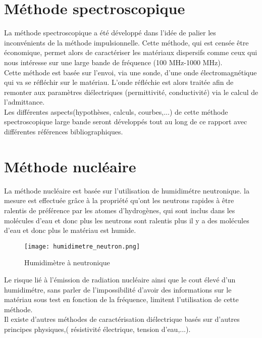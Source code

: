 \section{Méthode spectroscopique}
La méthode spectroscopique a été développé dans l'idée de palier les inconvénients de la méthode impulsionnelle. Cette méthode, qui est censée être économique, permet alors de caractériser les matériaux dispersifs comme ceux qui nous intéresse sur une large bande de fréquence (100 MHz-1000 MHz).\\
Cette méthode est basée sur l'envoi, via une sonde, d'une onde électromagnétique qui va se réfléchir sur le matériau. L'onde réfléchie est alors traitée afin de remonter aux paramètres diélectriques (permittivité, conductivité) via le calcul de l'admittance.\\
Les différentes aspects(hypothèses, calculs, courbes,...) de cette méthode spectroscopique large bande seront développés tout au long de ce rapport avec différentes références bibliographiques.
\section{Méthode nucléaire}
La méthode nucléaire est basée sur l'utilisation de humidimétre neutronique. la mesure est effectuée grâce à la propriété qu'ont les neutrons rapides à être ralentis de préférence par les atomes d'hydrogènes, qui sont inclus dans les molécules d'eau et donc plus les neutrons sont ralentis plus il y a des molécules d'eau et donc plus le matériau est humide.\\
\begin{figure}[h!]
\centering
\texttt{[image: humidimetre\_neutron.png]}
\caption{Humidimètre à neutronique}
\end{figure}
Le risque lié à l'émission de radiation nucléaire ainsi que le cout élevé d'un humidimétre, sans parler de l'impossibilité d'avoir des informations sur le matériau sous test en fonction de la fréquence, limitent l'utilisation de cette méthode.\\
\break
Il existe d'autres méthodes de caractérisation diélectrique basés sur d'autres principes physiques\cite{ref14},\cite{ref11}( résistivité électrique, tension d'eau,...).